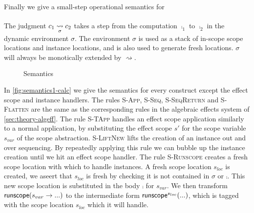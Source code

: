 {Finally we give a small-step operational semantics for \lang{}
\\\\
The judgment $c_1 \underset{\sigma}{\rightsquigarrow} c_2$ takes a step from the computation $\comp_1$ to $\comp_2$ in the dynamic environment $\sigma$.
The environment $\sigma$ is used as a stack of in-scope scope locations and instance locations, and is also used to generate fresh locations.
$\sigma$ will always be monotically extended by $\rightsquigarrow$.

\begin{figure}[h]
\caption{Semantics}
\centering
{}
\end{figure}

In \cref{fig:semantics1-calc} we give the semantics for every construct except the effect scope and instance handlers.
The rules \textsc{S-App}, \textsc{S-Seq}, \textsc{S-SeqReturn} and \textsc{S-Flatten} are the same as the corresponding rules in the
algebraic effects system of \cref{sec:theory-algeff}.
The rule \textsc{S-TApp} handles an effect scope application similarly to a normal application, by substituting the effect scope $s'$ for the scope variable $s_{var}$ of the scope abstraction.
\textsc{S-LiftNew} lifts the creation of an instance out and over sequencing.
By repeatedly applying this rule we can bubble up the instance creation until we hit an effect scope handler.
The rule \textsc{S-Runscope} creates a fresh scope location with which to handle instances.
A fresh scope location $s_{loc}$ is created, we aseert that $s_{loc}$ is fresh by checking it is not contained in $\sigma$ or $\comp$.
This new scope location is substituted in the body $\comp$ for $s_{var}$.
We then transform $\mathsf{runscope} ( s_{var} \rightarrow ... )$ to the intermediate form $\mathsf{runscope}^{s_{loc}} ( ... )$, which is tagged with the scope location $s_{loc}$ which it will handle.

}
